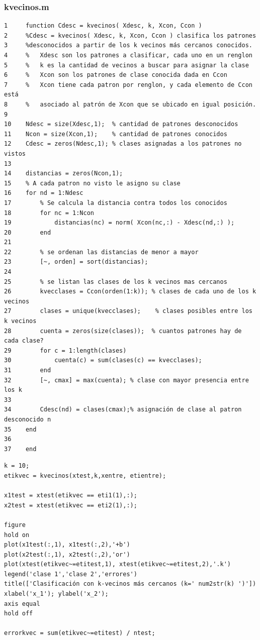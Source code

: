 \documentclass[11pt,a4paper,final]{article}
\begin{document}
\subsubsection*{kvecinos.m}
\begin{verbatim}
1     function Cdesc = kvecinos( Xdesc, k, Xcon, Ccon )
2     %Cdesc = kvecinos( Xdesc, k, Xcon, Ccon ) clasifica los patrones
3     %desconocidos a partir de los k vecinos más cercanos conocidos.
4     %   Xdesc son los patrones a clasificar, cada uno en un renglon
5     %   k es la cantidad de vecinos a buscar para asignar la clase
6     %   Xcon son los patrones de clase conocida dada en Ccon
7     %   Xcon tiene cada patron por renglon, y cada elemento de Ccon está
8     %   asociado al patrón de Xcon que se ubicado en igual posición.
9     
10    Ndesc = size(Xdesc,1);  % cantidad de patrones desconocidos
11    Ncon = size(Xcon,1);    % cantidad de patrones conocidos
12    Cdesc = zeros(Ndesc,1); % clases asignadas a los patrones no vistos
13    
14    distancias = zeros(Ncon,1);
15    % A cada patron no visto le asigno su clase
16    for nd = 1:Ndesc
17        % Se calcula la distancia contra todos los conocidos
18        for nc = 1:Ncon
19            distancias(nc) = norm( Xcon(nc,:) - Xdesc(nd,:) );
20        end
21        
22        % se ordenan las distancias de menor a mayor
23        [~, orden] = sort(distancias); 
24        
25        % se listan las clases de los k vecinos mas cercanos
26        kvecclases = Ccon(orden(1:k)); % clases de cada uno de los k vecinos
27        clases = unique(kvecclases);    % clases posibles entre los k vecinos
28        cuenta = zeros(size(clases));  % cuantos patrones hay de cada clase?
29        for c = 1:length(clases)
30            cuenta(c) = sum(clases(c) == kvecclases);
31        end
32        [~, cmax] = max(cuenta); % clase con mayor presencia entre los k
33        
34        Cdesc(nd) = clases(cmax);% asignación de clase al patron desconocido n
35    end
36    
37    end
\end{verbatim}

\begin{verbatim}
k = 10;
etikvec = kvecinos(xtest,k,xentre, etientre);

x1test = xtest(etikvec == eti1(1),:);
x2test = xtest(etikvec == eti2(1),:);

figure
hold on
plot(x1test(:,1), x1test(:,2),'+b')
plot(x2test(:,1), x2test(:,2),'or')
plot(xtest(etikvec~=etitest,1), xtest(etikvec~=etitest,2),'.k')
legend('clase 1','clase 2','errores')
title(['Clasificación con k-vecinos más cercanos (k=' num2str(k) ')'])
xlabel('x_1'); ylabel('x_2');
axis equal
hold off

errorkvec = sum(etikvec~=etitest) / ntest;
\end{verbatim}
\end{document}

